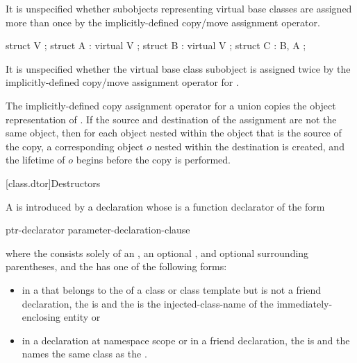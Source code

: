 %
It is unspecified whether subobjects representing virtual base classes
are assigned more than once by the implicitly-defined copy/move assignment
operator.
\begin{example}
\begin{codeblock}
struct V { };
struct A : virtual V { };
struct B : virtual V { };
struct C : B, A { };
\end{codeblock}

It is unspecified whether the virtual base class subobject
is assigned twice by the implicitly-defined copy/move assignment operator for
.
\end{example}

\pnum
The implicitly-defined copy assignment operator for a
union  copies the object representation of .
If the source and destination of the assignment are not the same object, then
for each object nested within
the object that is the source of the copy,
a corresponding object $o$ nested within the destination is created,
and the lifetime of $o$ begins before the copy is performed.

[class.dtor]{Destructors}%
%
%

\pnum
A  is introduced by a declaration
whose  is a
function declarator of the form
\begin{ncbnf}
ptr-declarator \terminal{(} parameter-declaration-clause \terminal{)}  
\end{ncbnf}
where the  consists solely of an
, an optional ,
and optional surrounding parentheses, and the  has
one of the following forms:
\begin{itemize}
\item
in a  that belongs to the
 of a class or class template
but is not a friend
declaration, the  is
\tcode{\~} and the  is the
injected-class-name of the immediately-enclosing entity or

\item
in a declaration at namespace scope or in a friend declaration, the
 is 
\tcode{\~} and the  names the
same class as the .
\end{itemize}

